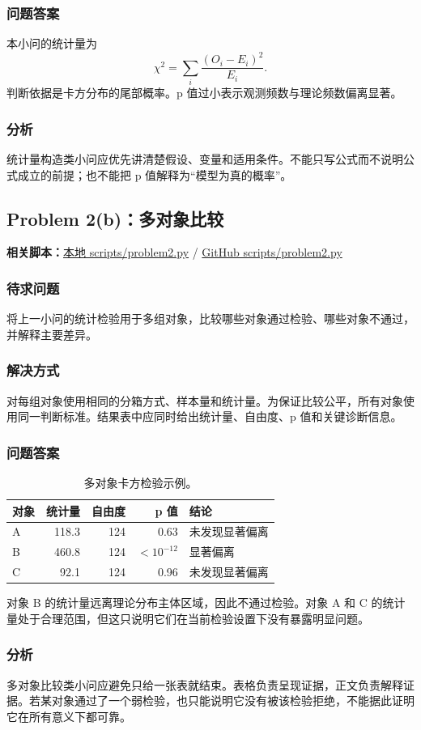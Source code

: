 \documentclass[12pt,fontset=none]{ctexart}
\newcommand{\problem}[1]{\subsection{#1}}
\newcommand{\blocktitle}[1]{\subsubsection{#1}}
\newcommand{\scriptpath}[1]{{#1}}
\newcommand{\githubscriptsbase}{https://github.com/Void0312Aurora/computational-physics-homework-2026/blob/main/00/scripts}
\newcommand{\scriptlink}[1]{\noindent\textbf{相关脚本：}\href{../../../scripts/#1}{\scriptpath{本地 scripts/#1}} / \href{\githubscriptsbase/#1}{\scriptpath{GitHub scripts/#1}}\par\medskip}
\begin{document}
\blocktitle{问题答案}
本小问的统计量为
\[
  \chi^2=\sum_i\frac{(O_i-E_i)^2}{E_i}.
\]
判断依据是卡方分布的尾部概率。p 值过小表示观测频数与理论频数偏离显著。

\blocktitle{分析}
统计量构造类小问应优先讲清楚假设、变量和适用条件。不能只写公式而不说明公式成立的前提；也不能把 p 值解释为“模型为真的概率”。

\problem{Problem 2(b)：多对象比较}

\scriptlink{problem2.py}

\blocktitle{待求问题}
将上一小问的统计检验用于多组对象，比较哪些对象通过检验、哪些对象不通过，并解释主要差异。

\blocktitle{解决方式}
对每组对象使用相同的分箱方式、样本量和统计量。为保证比较公平，所有对象使用同一判断标准。结果表中应同时给出统计量、自由度、p 值和关键诊断信息。

\blocktitle{问题答案}
\begin{table}[H]
  \centering
  \caption{多对象卡方检验示例。}
  \begin{tabular}{lrrrl}
    \toprule
    对象 & 统计量 & 自由度 & p 值 & 结论 \\
    \midrule
    A & 118.3 & 124 & 0.63 & 未发现显著偏离 \\
    B & 460.8 & 124 & $<10^{-12}$ & 显著偏离 \\
    C & 92.1 & 124 & 0.96 & 未发现显著偏离 \\
    \bottomrule
  \end{tabular}
\end{table}

对象 B 的统计量远离理论分布主体区域，因此不通过检验。对象 A 和 C 的统计量处于合理范围，但这只说明它们在当前检验设置下没有暴露明显问题。

\blocktitle{分析}
多对象比较类小问应避免只给一张表就结束。表格负责呈现证据，正文负责解释证据。若某对象通过了一个弱检验，也只能说明它没有被该检验拒绝，不能据此证明它在所有意义下都可靠。
\end{document}
